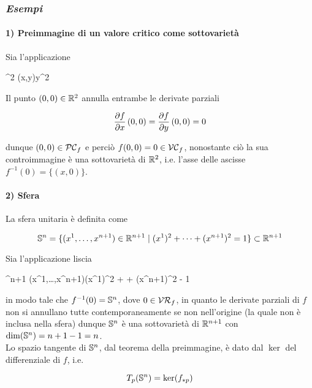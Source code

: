\subsubsection{\textit{Esempi}}

\paragraph{1) Preimmagine di un valore critico come sottovarietà}

Sia l'applicazione

	{\R^{2}}{\R}
	{(x,y)}{y^{2}}

Il punto $ (0,0) \in \R^{2} $ annulla entrambe le derivate parziali

\begin{equation}
	\pdv{f}{x} \, (0,0) = \pdv{f}{y} \, (0,0) = 0
\end{equation}

dunque $ (0,0) \in \PC_{f} $ e perciò $ f(0,0) = 0 \in \VC_{f} $, nonostante ciò la sua controimmagine è una sottovarietà di $ \R^{2} $, i.e. l'asse delle ascisse $ f^{-1}(0) = \{(x,0)\} $.

\paragraph{2) Sfera}

La sfera unitaria è definita come

\begin{equation}
	\S^{n} = \{ (x^{1},\dots,x^{n+1}) \in \R^{n+1} \mid (x^{1})^{2} + \cdots + (x^{n+1})^{2} = 1 \} \subset \R^{n+1}
\end{equation}

Sia l'applicazione liscia

	{\R^{n+1}}{\R}
	{(x^{1},\dots,x^{n+1})}{(x^{1})^{2} + \cdots + (x^{n+1})^{2} - 1}

in modo tale che $ f^{-1}(0) = \S^{n} $, dove $ 0 \in \VR_{f} $, in quanto le derivate parziali di $ f $ non si annullano tutte contemporaneamente se non nell'origine (la quale non è inclusa nella sfera) dunque $ \S^{n} $ è una sottovarietà di $ \R^{n+1} $ con $ \dim(\S^{n}) = n+1-1 = n $.\\
Lo spazio tangente di $ \S^{n} $, dal teorema della preimmagine, è dato dal $ \ker $ del differenziale di $ f $, i.e. 

\begin{equation}
	T_{p}(\S^{n}) = \ker(f_{*p})
\end{equation}


